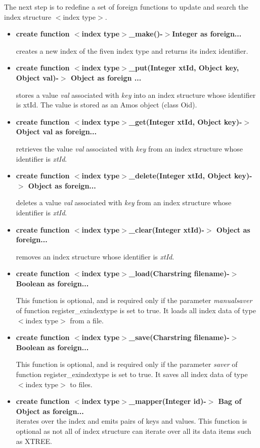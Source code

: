\documentclass[12pt]{article}
\begin{document}
The next step is to redefine a set of foreign functions to update and
search the index structure $<$index type$>$.
\begin{itemize}
\item \textbf{create function $<$index type$>$\_make()-$>$Integer as foreign...}

creates a new index of the fiven index type and returns its index
identifier.
\item \textbf{create function $<$index type$>$\_put(Integer xtId, Object key, Object val)-$>$ Object as foreign ...}

stores a value {\em val} associated with {\em key} into an index
structure whose identifier is xtId. The value is stored as an Amos
object (class Oid).

\item \textbf{\textbf{create function $<$index type$>$\_get(Integer xtId, Object key)-$>$ Object val as foreign...}}

retrieves the value {\em val} associated with {\em key} from an index
structure whose identifier is {\em xtId}.

\item \textbf{create function $<$index type$>$\_delete(Integer xtId, Object key)-$>$ Object as foreign...}

deletes a value {\em val} associated with {\em key} from an index
structure whose identifier is {\em xtId}.

\item \textbf{create function $<$index type$>$\_clear(Integer xtId)-$>$ Object as foreign...}

removes an index structure whose identifier is {\em xtId}.

\item \textbf{create function $<$index type$>$\_load(Charstring filename)-$>$ Boolean as foreign...}

This function is optional, and is required only if the parameter
\emph{manualsaver} of function register\_exindextype is set to
true. It loads all index data of type $<$index type$>$ from a file.

\item \textbf{create function $<$index type$>$\_save(Charstring filename)-$>$ Boolean as foreign...}

This function is optional, and is required only if the parameter
\emph{saver} of function register\_exindextype is set to
true. It saves all index data of type $<$index type$>$ to files.

\item \textbf{create function $<$index type$>$\_mapper(Integer id)-$>$ Bag of Object as foreign...}\\
iterates over the index and emits pairs of keys and values. This
function is optional as not all of index structure can iterate over
all its data items such as XTREE.
\end{itemize}
\end{document}
